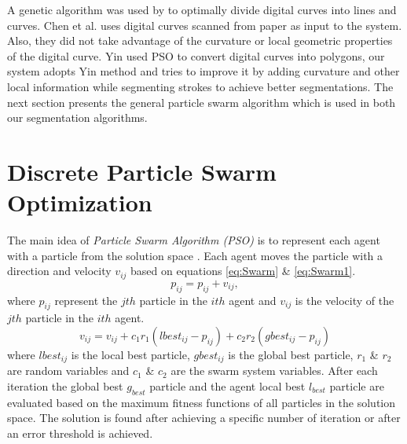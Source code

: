 \documentclass{article}
\begin{document}
A genetic algorithm was used by \cite{CruveDivisionSwarm} to optimally divide digital curves into lines and curves. Chen et al. \cite{CruveDivisionSwarm} uses digital curves scanned from paper as input to the system. Also, they did not take advantage of the curvature or local geometric properties of the digital curve. Yin \cite{PolygonApproximationPSO} used PSO to convert digital curves into polygons, our system adopts  Yin \cite{PolygonApproximationPSO} method and tries to improve it by adding curvature and other local information while segmenting strokes to achieve better segmentations. The next section presents the general particle swarm algorithm which is used in both our segmentation algorithms. %

\section{Discrete Particle Swarm Optimization}
\label{sec:ParticleSwarmAlgorithm}
The main idea of \textit{Particle Swarm Algorithm (PSO)} is to represent each agent with a particle from the solution space \cite{PSOFirst}. Each agent moves the particle with a direction and velocity $v_{ij}$ based on equations \ref{eq:Swarm} \& \ref{eq:Swarm1}.
\begin{equation}
p_{ij}=p_{ij}+v_{ij},
\label{eq:Swarm1}
\end{equation}
where $p_{ij}$ represent the $jth$ particle in the $ith$ agent and $v_{ij}$ is the velocity of the $jth$ particle in the $ith$ agent.
 \begin{equation}
v_{ij}  = v_{ij}  + c_1 r_1 (lbest_{ij}  - p_{ij} ) + c_2 r_2 (gbest_{ij}  - p_{ij} )
\label{eq:Swarm}
\end{equation}
 where $lbest_{ij}$ is the local best particle, $gbest_{ij}$ is the global best particle, $r_1$ \& $r_2$ are random variables and $c_1$ \& $c_2$ are the swarm system variables.
 After each iteration the global best $g_{best}$ particle and the agent local best $l_{best}$ particle are evaluated based on the maximum fitness functions of all particles in the solution space. The solution is found after achieving a specific number of iteration or after an error threshold is achieved.
\end{document}
